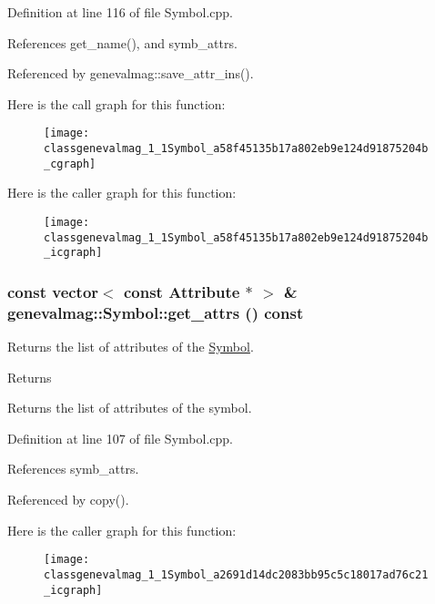 Definition at line 116 of file Symbol.cpp.



References get\_\-name(), and symb\_\-attrs.



Referenced by genevalmag::save\_\-attr\_\-ins().



Here is the call graph for this function:\nopagebreak
\begin{figure}[H]
\begin{center}
\leavevmode
\texttt{[image: classgenevalmag\_1\_1Symbol\_a58f45135b17a802eb9e124d91875204b\_cgraph]}
\end{center}
\end{figure}




Here is the caller graph for this function:\nopagebreak
\begin{figure}[H]
\begin{center}
\leavevmode
\texttt{[image: classgenevalmag\_1\_1Symbol\_a58f45135b17a802eb9e124d91875204b\_icgraph]}
\end{center}
\end{figure}


\hypertarget{classgenevalmag_1_1Symbol_a2691d14dc2083bb95c5c18017ad76c21}{
\subsubsection[{get\_\-attrs}]{\setlength{\rightskip}{0pt plus 5cm}const vector$<$ const {\bf Attribute} $\ast$ $>$ \& genevalmag::Symbol::get\_\-attrs () const}}
\label{classgenevalmag_1_1Symbol_a2691d14dc2083bb95c5c18017ad76c21}
Returns the list of attributes of the \hyperlink{classgenevalmag_1_1Symbol}{Symbol}. \begin{DoxyReturn}{Returns}

\end{DoxyReturn}
Returns the list of attributes of the symbol. 

Definition at line 107 of file Symbol.cpp.



References symb\_\-attrs.



Referenced by copy().



Here is the caller graph for this function:\nopagebreak
\begin{figure}[H]
\begin{center}
\leavevmode
\texttt{[image: classgenevalmag\_1\_1Symbol\_a2691d14dc2083bb95c5c18017ad76c21\_icgraph]}
\end{center}
\end{figure}


